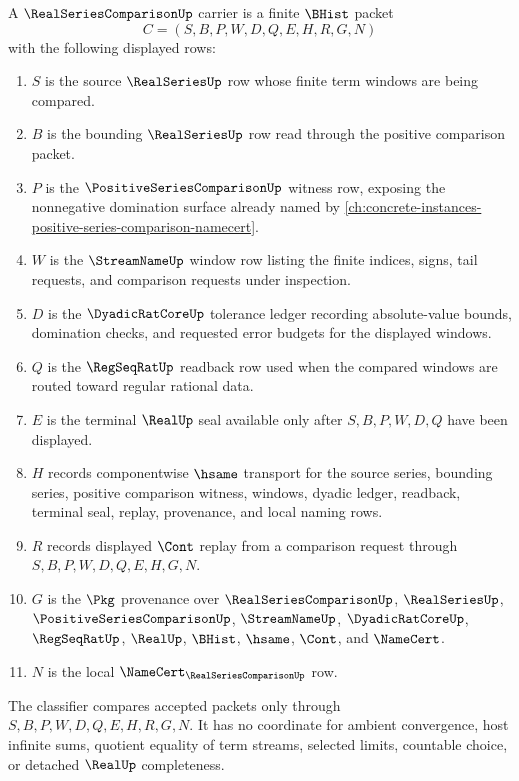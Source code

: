 \begin{definition}
\label{def:real-series-comparison-carrier}
A $\RealSeriesComparisonUp$ carrier is a finite $\BHist$ packet
$$
C=(S,B,P,W,D,Q,E,H,R,G,N)
$$
with the following displayed rows:
\begin{enumerate}
\item $S$ is the source $\RealSeriesUp$ row whose finite term windows are being compared.
\item $B$ is the bounding $\RealSeriesUp$ row read through the positive comparison packet.
\item $P$ is the $\PositiveSeriesComparisonUp$ witness row, exposing the nonnegative domination surface already named by \autoref{ch:concrete-instances-positive-series-comparison-namecert}.
\item $W$ is the $\StreamNameUp$ window row listing the finite indices, signs, tail requests, and comparison requests under inspection.
\item $D$ is the $\DyadicRatCoreUp$ tolerance ledger recording absolute-value bounds, domination checks, and requested error budgets for the displayed windows.
\item $Q$ is the $\RegSeqRatUp$ readback row used when the compared windows are routed toward regular rational data.
\item $E$ is the terminal $\RealUp$ seal available only after $S,B,P,W,D,Q$ have been displayed.
\item $H$ records componentwise $\hsame$ transport for the source series, bounding series, positive comparison witness, windows, dyadic ledger, readback, terminal seal, replay, provenance, and local naming rows.
\item $R$ records displayed $\Cont$ replay from a comparison request through $S,B,P,W,D,Q,E,H,G,N$.
\item $G$ is the $\Pkg$ provenance over $\RealSeriesComparisonUp$, $\RealSeriesUp$, $\PositiveSeriesComparisonUp$, $\StreamNameUp$, $\DyadicRatCoreUp$, $\RegSeqRatUp$, $\RealUp$, $\BHist$, $\hsame$, $\Cont$, and $\NameCert$.
\item $N$ is the local $\NameCert_{\RealSeriesComparisonUp}$ row.
\end{enumerate}
The classifier compares accepted packets only through $S,B,P,W,D,Q,E,H,R,G,N$. It has no coordinate for ambient convergence, host infinite sums, quotient equality of term streams, selected limits, countable choice, or detached $\RealUp$ completeness.
\end{definition}

